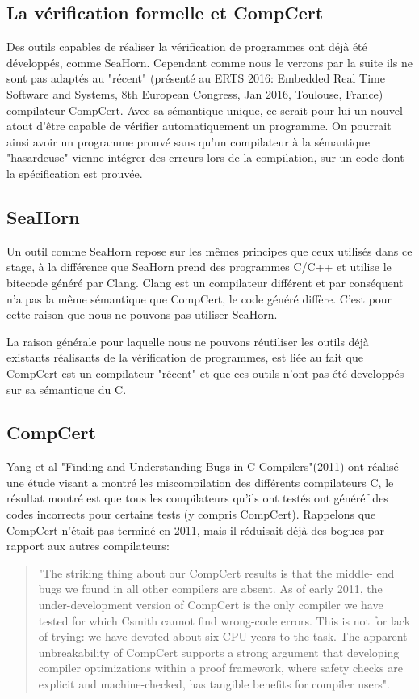 \subsection{La vérification formelle et CompCert}
	Des outils capables de réaliser la vérification de programmes ont déjà été développés, comme SeaHorn. Cependant comme nous le verrons par la suite ils ne sont pas adaptés au  "récent" 
(présenté au ERTS 2016: Embedded Real Time Software and Systems, 8th European Congress, Jan 2016, Toulouse, France) 
compilateur CompCert. Avec sa sémantique unique, ce serait pour lui un nouvel atout d'être capable de vérifier automatiquement un programme. On pourrait ainsi avoir un programme prouvé sans qu'un compilateur à la sémantique "hasardeuse" vienne intégrer des erreurs lors de la compilation, sur un code dont la spécification est prouvée.

\label{sec:2}
\subsection{SeaHorn}
	Un outil comme SeaHorn repose sur les mêmes principes que ceux utilisés dans ce stage, à la différence que SeaHorn prend des programmes C/C++ et utilise le bitecode généré par Clang.
	Clang est un compilateur différent et par conséquent n'a pas la même sémantique que CompCert, le code généré diffère. C'est pour cette raison que nous ne pouvons pas utiliser SeaHorn.
	
	La raison générale pour laquelle nous ne pouvons réutiliser les outils déjà existants réalisants de la vérification de programmes, est liée au fait que CompCert est un compilateur "récent" et que ces outils n'ont pas été developpés sur sa sémantique du C. 


\label{sec:3}
\subsection{CompCert}

	Yang et al "Finding and Understanding Bugs in C Compilers"(2011) ont réalisé une étude visant a montré les miscompilation des différents compilateurs C, le résultat montré est que tous les compilateurs qu'ils ont testés ont généréf des codes incorrects pour certains tests (y compris CompCert). Rappelons que CompCert n'était pas terminé en 2011, mais il réduisait déjà des bogues par rapport aux autres compilateurs:
\begin{quote}
"The striking thing about our CompCert results is that the middle-
end bugs we found in all other compilers are absent. As of early 2011,
the under-development version of CompCert is the only compiler we
have tested for which Csmith cannot find wrong-code errors. This is
not for lack of trying: we have devoted about six CPU-years to the
task. The apparent unbreakability of CompCert supports a strong
argument that developing compiler optimizations within a proof
framework, where safety checks are explicit and machine-checked,
has tangible benefits for compiler users".
\end{quote}

